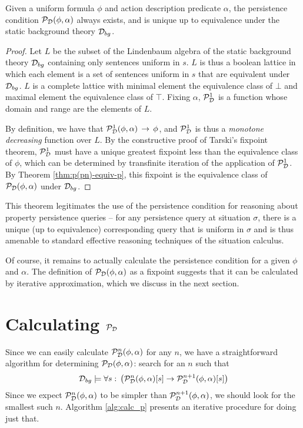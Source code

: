\begin{thm}
Given a uniform formula $\phi$ and action description predicate $\alpha$,
the persistence condition $\mathcal{P}_{\mathcal{D}}(\phi,\alpha)$ always exists,
and is unique up to equivalence under the static background theory
$\mathcal{D}_{bg}$. \label{thm:p-always-exists} 
\end{thm}
\begin{proof}
Let $L$ be the subset of the Lindenbaum algebra of the static background
theory $\mathcal{D}_{bg}$ containing only sentences uniform in $s$. $L$
is thus a boolean lattice in which each element is a set of sentences
uniform in $s$ that are equivalent under $\mathcal{D}_{bg}$. $L$ is a complete
lattice with minimal element the equivalence class of $\bot$ and
maximal element the equivalence class of $\top$. Fixing $\alpha$,
$\mathcal{P}^{1}_{\mathcal{D}}$ is a function whose domain and range are the elements of
$L$.

By definition, we have that $\mathcal{P}^{1}_{\mathcal{D}}(\phi,\alpha)\,\rightarrow\,\phi$,
and $\mathcal{P}^{1}_{\mathcal{D}}$ is thus a \emph{monotone decreasing} function over $L$.
By the constructive proof of Tarski's fixpoint theorem, $\mathcal{P}^{1}_{\mathcal{D}}$
must have a unique greatest fixpoint less than the equivalence class
of $\phi$, which can be determined by transfinite iteration of the
application of $\mathcal{P}^{1}_{\mathcal{D}}$. By Theorem \ref{thm:p(pn)-equiv-p}, this
fixpoint is the equivalence class of $\mathcal{P}_{\mathcal{D}}(\phi,\alpha)$ under
$\mathcal{D}_{bg}$. 
\end{proof}
This theorem legitimates the use of the persistence condition for
reasoning about property persistence queries -- for any persistence
query at situation $\sigma$, there is a unique (up to equivalence)
corresponding query that is uniform in $\sigma$ and is thus amenable
to standard effective reasoning techniques of the situation calculus.

Of course, it remains to actually calculate the persistence condition
for a given $\phi$ and $\alpha$. The definition of $\mathcal{P}_{\mathcal{D}}(\phi,\alpha)$
as a fixpoint suggests that it can be calculated by iterative approximation,
which we discuss in the next section.


\section{Calculating $\mathcal{P}_{\mathcal{D}}$\label{sec:Persistence:Calculating}}

Since we can easily calculate $\mathcal{P}_{\mathcal{D}}^{n}(\phi,\alpha)$ for any
$n$, we have a straightforward algorithm for determining $\mathcal{P}_{\mathcal{D}}(\phi,\alpha)$:
search for an $n$ such that\[
\mathcal{D}_{bg}\models\forall s:\,\left(\mathcal{P}_{\mathcal{D}}^{n}(\phi,\alpha)[s]\rightarrow\mathcal{P}_{\mathcal{D}}^{n+1}(\phi,\alpha)[s]\right)\]
 Since we expect $\mathcal{P}_{\mathcal{D}}^{n}(\phi,\alpha)$ to be simpler than
$\mathcal{P}_{\mathcal{D}}^{n+1}(\phi,\alpha)$, we should look for the smallest
such $n$. Algorithm \ref{alg:calc_p} presents an iterative procedure
for doing just that.

